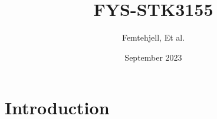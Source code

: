 \documentclass{article}
\title{FYS-STK3155}
\author{Femtehjell, Et al.}
\date{September 2023}
\begin{document}
\maketitle

\section{Introduction}
\end{document}
